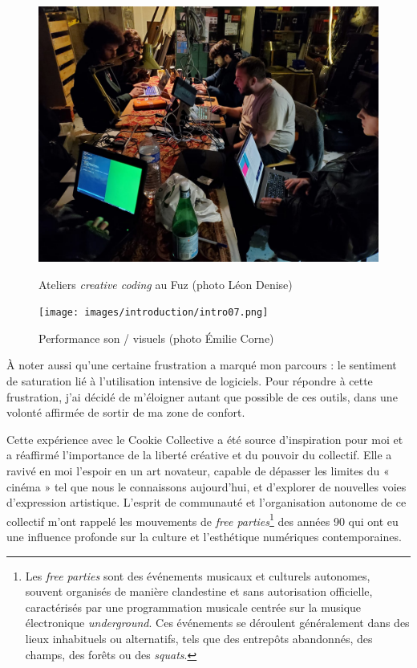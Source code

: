 \begin{figure}[h]
  \begin{minipage}[b]{0.45\linewidth}
    \centering
    \includegraphics[width=\linewidth]{images/introduction/intro04.jpg}
    \caption{Ateliers \textit{creative coding} au Fuz (photo Léon Denise)}
    \label{intro04}
  \end{minipage}
  \hspace{0.1\linewidth} %
  \begin{minipage}[b]{0.45\linewidth}
    \centering
    \texttt{[image: images/introduction/intro07.png]}
    \caption{Performance son / visuels (photo Émilie Corne)}
    \label{intro07}
  \end{minipage}
\end{figure}

À noter aussi qu'une certaine frustration a marqué mon parcours : le sentiment de saturation lié à l'utilisation intensive de logiciels. Pour répondre à cette frustration, j'ai décidé de m'éloigner autant que possible de ces outils, dans une volonté affirmée de sortir de ma zone de confort.

Cette expérience avec le Cookie Collective a été source d'inspiration pour moi et a réaffirmé l'importance de la liberté créative et du pouvoir du collectif. Elle a ravivé en moi l'espoir en un art novateur, capable de dépasser les limites du « cinéma » tel que nous le connaissons aujourd'hui, et d'explorer de nouvelles voies d'expression artistique. L'esprit de communauté et l'organisation autonome de ce collectif m'ont rappelé les mouvements de \textit{free parties}\footnote{Les \textit{free parties} sont des événements musicaux et culturels autonomes, souvent organisés de manière clandestine et sans autorisation officielle, caractérisés par une programmation musicale centrée sur la musique électronique \textit{underground}. Ces événements se déroulent généralement dans des lieux inhabituels ou alternatifs, tels que des entrepôts abandonnés, des champs, des forêts ou des \textit{squats}.} des années 90 qui ont eu une influence profonde sur la culture et l'esthétique numériques contemporaines.

